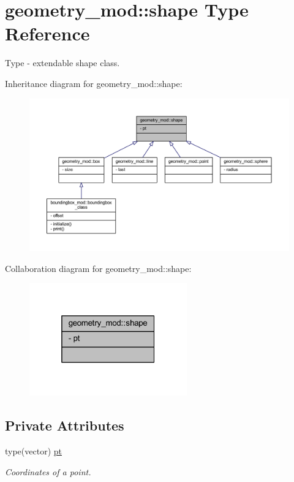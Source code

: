 \hypertarget{structgeometry__mod_1_1shape}{}\section{geometry\+\_\+mod\+:\+:shape Type Reference}
\label{structgeometry__mod_1_1shape}


Type -\/ extendable shape class.  




Inheritance diagram for geometry\+\_\+mod\+:\+:shape\+:\nopagebreak
\begin{figure}[H]
\begin{center}
\leavevmode
\includegraphics[width=350pt]{structgeometry__mod_1_1shape__inherit__graph}
\end{center}
\end{figure}


Collaboration diagram for geometry\+\_\+mod\+:\+:shape\+:\nopagebreak
\begin{figure}[H]
\begin{center}
\leavevmode
\includegraphics[width=193pt]{structgeometry__mod_1_1shape__coll__graph}
\end{center}
\end{figure}
\subsection*{Private Attributes}
\begin{DoxyCompactItemize}
\item 
type(vector) \mbox{\hyperlink{structgeometry__mod_1_1shape_a4c7824c0af103efbef53cbcacb9a5de0}{pt}}
\begin{DoxyCompactList}\small\item\em Coordinates of a point. \end{DoxyCompactList}\end{DoxyCompactItemize}


